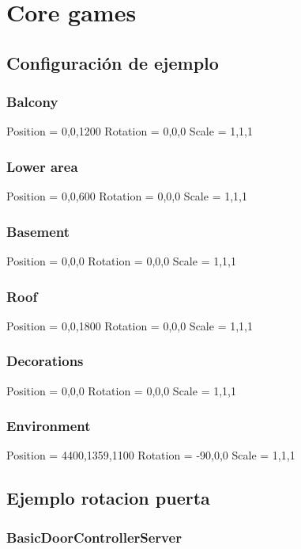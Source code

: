 \chapter{Core games}

\section*{Configuración de ejemplo}

\subsection{Balcony}

Position = 0,0,1200
Rotation = 0,0,0
Scale = 1,1,1

\subsection{Lower area}

Position = 0,0,600
Rotation = 0,0,0
Scale = 1,1,1

\subsection{Basement}

Position = 0,0,0
Rotation = 0,0,0
Scale = 1,1,1

\subsection{Roof}

Position = 0,0,1800
Rotation = 0,0,0
Scale = 1,1,1

\subsection{Decorations}

Position = 0,0,0
Rotation = 0,0,0
Scale = 1,1,1

\subsection{Environment}

Position = 4400,1359,1100
Rotation = -90,0,0
Scale = 1,1,1


\section{Ejemplo rotacion puerta}

\subsection{BasicDoorControllerServer}

